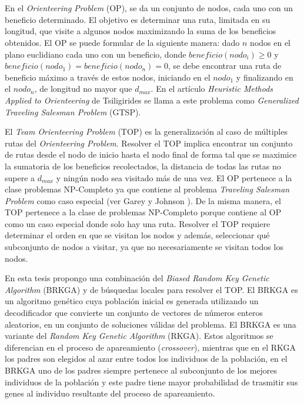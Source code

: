 
\chapter*{\tituloAbstractEs}

\noindent En el \textit{Orienteering Problem} (OP), se da un conjunto de nodos, cada uno con un beneficio determinado. El objetivo es determinar una ruta, limitada en su longitud, que visite a algunos nodos maximizando la suma de los beneficios obtenidos. El OP se puede formular de la siguiente manera: dado $n$ nodos en el plano euclidiano cada uno con un beneficio, donde $beneficio(nodo_i) \geq 0$ y $beneficio(nodo_1) = beneficio(nodo_n) = 0$, se debe encontrar una ruta de beneficio máximo a través de estos nodos, iniciando en el $nodo_1$ y finalizando en el $nodo_n$, de longitud no mayor que $d_{max}$. En el artículo \textit{Heuristic Methods Applied to Orienteering} de Tsiligirides \cite{Tsiligirides} se llama a este problema como \textit{Generalized Traveling Salesman Problem} (GTSP).

\bigskip

El \textit{Team Orienteering Problem} (TOP) es la generalización al caso de múltiples rutas del \textit{Orienteering Problem}. Resolver el TOP implica encontrar un conjunto de rutas desde el nodo de inicio hasta el nodo final de forma tal que se maximice la sumatoria de los beneficios recolectados, la distancia de todas las rutas no supere a $d_{max}$ y ningún nodo sea visitado más de una vez. El OP pertenece a la clase problemas NP-Completo ya que contiene al problema \textit{Traveling Salesman Problem} como caso especial (ver Garey y Johnson \cite{GareyJohnson}). De la misma manera, el TOP pertenece a la clase de problemas NP-Completo porque contiene al OP como un caso especial donde solo hay una ruta. Resolver el TOP requiere determinar el orden en que se visitan los nodos y además, seleccionar qué subconjunto de nodos a visitar, ya que no necesariamente se visitan todos los nodos.

\bigskip

En esta tesis propongo una combinación del \textit{Biased Random Key Genetic Algorithm} (BRKGA) y de búsquedas locales para resolver el TOP. El BRKGA es un algoritmo genético cuya población inicial es generada utilizando un decodificador que convierte un conjunto de vectores de números enteros aleatorios, en un conjunto de soluciones válidas del problema. El BRKGA es una variante del \textit{Random Key Genetic Algorithm} (RKGA). Estos algoritmos se diferencian en el proceso de apareamiento (\textit{crossover}), mientras que en el RKGA los padres son elegidos al azar entre todos los individuos de la población, en el BRKGA uno de los padres siempre pertenece al subconjunto de los mejores individuos de la población y este padre tiene mayor probabilidad de trasmitir sus genes al individuo resultante del proceso de apareamiento.

